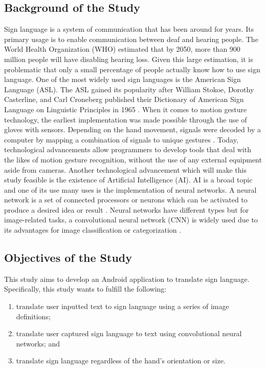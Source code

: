 \documentclass[journal]{./IEEE/IEEEtran}
\begin{document}
\subsection{Background of the Study}
Sign language is a system of communication that has been around for years. Its primary usage is to enable communication between deaf and hearing people. The World Health Organization (WHO) \cite{WHO2018} estimated that by 2050, more than 900 million people will have disabling hearing loss. Given this large estimation, it is problematic that only a small percentage of people actually know how to use sign language. One of the most widely used sign languages is the American Sign Language (ASL). The ASL gained its popularity after William Stokoe, Dorothy Casterline, and Carl Croneberg published their Dictionary of American Sign Language on Linguistic Principles in 1965 \cite{Wilcox1991}.
\newline
\indent When it comes to motion gesture technology, the earliest implementation was made possible through the use of gloves with sensors. Depending on the hand movement, signals were decoded by a computer by mapping a combination of signals to unique gestures \cite{Sharma2015}.  Today, technological advancements allow programmers to develop tools that deal with the likes of motion gesture recognition, without the use of any external equipment aside from cameras.
\newline
\indent Another technological advancement which will make this study feasible is the existence of Artificial Intelligence (AI). AI is a broad topic and one of its use many uses is the implementation of neural networks. A neural network is a set of connected processors or neurons which can be activated to produce a desired idea or result \cite{Schmidhuber2015}. Neural networks have different types but for image-related tasks, a convolutional neural network (CNN) is widely used due to its advantages for image classification or categorization \cite{Wu2016}.

\subsection{Objectives of the Study}
This study aims to develop an Android application to translate sign language. Specifically, this study wants to fulfill the following:

\begin{enumerate}
\item translate user inputted text to sign language using a series of image definitions;
\item translate user captured sign language to text using convolutional neural networks; and
\item translate sign language regardless of the hand's orientation or size.
\end{enumerate}
\end{document}
